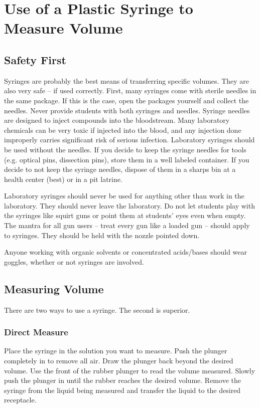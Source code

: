 \chapter{Use of a Plastic Syringe to Measure Volume} 
\label{cha:usesyringe}

\section{Safety First}

Syringes are probably the best means of transferring specific volumes. They are also very safe -- if used correctly. First, many syringes come with sterile needles in the same package. If this is the case, open the packages yourself and collect the needles. Never provide students with both syringes and needles. Syringe needles are designed to inject compounds into the bloodstream. Many laboratory chemicals can be very toxic if injected into the blood, and any injection done improperly carries significant risk of serious infection. Laboratory syringes should be used without the needles. If you decide to keep the syringe needles for tools (e.g. optical pins, dissection pins), store them in a well labeled container. If you decide to not keep the syringe needles, dispose of them in a sharps bin at a health center (best) or in a pit latrine.

Laboratory syringes should never be used for anything other than work in the laboratory. They should never leave the laboratory. Do not let students play with the syringes like squirt guns or point them at students’ eyes even when empty. The mantra for all gun users -- treat every gun like a loaded gun -- should apply to syringes. They should be held with the nozzle pointed down.

Anyone working with organic solvents or concentrated acids/bases should wear goggles, whether or not syringes are involved.

\section{Measuring Volume}

There are two ways to use a syringe. The second is superior.

\subsection{Direct Measure}
Place the syringe in the solution you want to measure. Push the plunger completely in to remove all air. Draw the plunger back beyond the desired volume. Use the front of the rubber plunger to read the volume measured. Slowly push the plunger in until the rubber reaches the desired volume. Remove the syringe from the liquid being measured and transfer the liquid to the desired receptacle.

